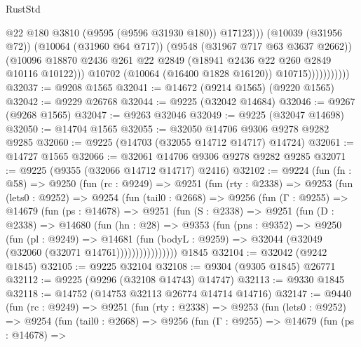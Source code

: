 \begin{lexlean}{RustStd}
\begin{coremodule}
                                  @22
                                  @180
                                  @3810
                                  (@9595 (@9596 @31930 @180))
                                  @17123)))
                            (@10039 (@31956 @72))
                            (@10064 (@31960 @64 @717))
                            (@9548 (@31967 @717 @63 @3637 @2662))
                            (@10096
                              @18870
                              @2436
                              @261
                              @22
                              @2849
                              (@18941 @2436 @22 @260 @2849 @10116 @10122)))
                          @10702
                          (@10064 (@16400 @1828 @16120))
                          @10715)))))))))))
@32037 := @9208 @1565
@32041 := @14672 (@9214 @1565) (@9220 @1565)
@32042 := @9229 @26768
@32044 := @9225 (@32042 @14684)
@32046 := @9267 (@9268 @1565)
@32047 := @9263 @32046
@32049 := @9225 (@32047 @14698)
@32050 := @14704 @1565
@32055 := @32050 @14706 @9306 @9278 @9282 @9285
@32060 := @9225 (@14703 (@32055 @14712 @14717) @14724)
@32061 := @14727 @1565
@32066 := @32061 @14706 @9306 @9278 @9282 @9285
@32071 := @9225 (@9355 (@32066 @14712 @14717) @2416)
@32102 := @9224
    (fun (fn : @58) =>
    @9250
      (fun (rc : @9249) =>
      @9251
        (fun (rty : @2338) =>
        @9253
          (fun (lets0 : @9252) =>
          @9254
            (fun (tail0 : @2668) =>
            @9256
              (fun (Γ : @9255) =>
              @14679
                (fun (ps : @14678) =>
                @9251
                  (fun (S : @2338) =>
                  @9251
                    (fun (D : @2338) =>
                    @14680
                      (fun (hn : @28) =>
                      @9353
                        (fun (pns : @9352) =>
                        @9250
                          (fun (pl : @9249) =>
                          @14681
                            (fun (bodyL : @9259) =>
                            @32044 (@32049 (@32060 (@32071 @14761))))))))))))))))
    @1845
@32104 := @32042 (@9242 @1845)
@32105 := @9225 @32104
@32108 := @9304 (@9305 @1845) @26771
@32112 := @9225 (@9296 (@32108 @14743) @14747)
@32113 := @9330 @1845
@32118 := @14752 (@14753 @32113 @26774 @14714 @14716)
@32147 := @9440
    (fun (rc : @9249) =>
    @9251
      (fun (rty : @2338) =>
      @9253
        (fun (lets0 : @9252) =>
        @9254
          (fun (tail0 : @2668) =>
          @9256
            (fun (Γ : @9255) =>
            @14679
              (fun (ps : @14678) =>

\end{coremodule}
\end{lexlean}
